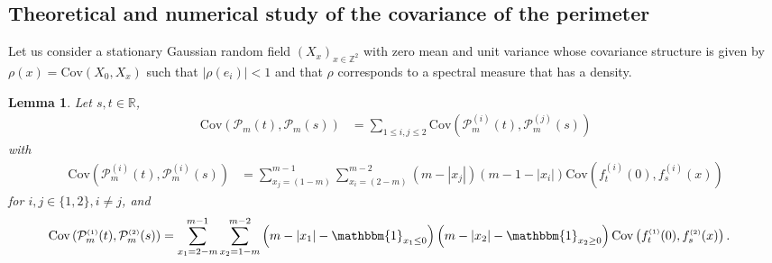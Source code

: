 \documentclass[12pt]{article}
\theoremstyle{Theorem}
\newtheorem{Lemma}[Theorem]{Lemma}
\theoremstyle{definition}
\begin{document}
\subsection{Theoretical and numerical study of the covariance of the perimeter}
Let us consider a stationary Gaussian random field $\left(X_{\scriptscriptstyle x}\right)_{x \in \mathbb{Z}^{2}}$ with zero mean and unit variance whose covariance structure is given by $\rho(x) = \text{Cov}\left(X_{\scriptscriptstyle 0}, X_{\scriptscriptstyle x}\right)$ such that $|\rho(e_i)| < 1$ and that $\rho$ corresponds to a spectral measure that has a density.
\begin{Lemma} 
Let $s, t \in \mathbb{R}$, 
\label{CovLemma}
\begin{align*}
\text{Cov}(\mathcal{P}_{m}(t), \mathcal{P}_{m}(s))  & = \sum_{1\leq i,j\leq 2}\text{Cov}(\mathcal{P}_{m}^{\scriptscriptstyle (i)}(t), \mathcal{P}_{m}^{\scriptscriptstyle (j)}(s)) 
\end{align*} 
with 
\begin{align*}
\text{Cov}\left(\mathcal{P}_{m}^{\scriptscriptstyle (i)}(t),\mathcal{P}_{m}^{\scriptscriptstyle (i)}(s) \right) 
& = \sum_{x_{\scriptscriptstyle j}=\left(1-m\right)}^{m-1}\sum_{x_{\scriptscriptstyle i}=\left(2-m\right)}^{m-2}\left(m -|x_{j}|\right)\left(m - 1- |x_{i}|\right) \text{Cov}\left(f_{t}^{\scriptscriptstyle (i)}(0), f_{s}^{\scriptscriptstyle (i)}(x) \right) 
\end{align*} 
for $i,j \in\{1,2\}, i\neq j$, and 
\begin{align*}
\text{Cov}\left(\mathcal{P}_{m}^{\scriptscriptstyle (1)}(t),\mathcal{P}_{m}^{\scriptscriptstyle (2)}(s) \right) 
& = \sum_{x_1=2-m}^{m-1} \sum_{x_2 = 1-m}^{m-2} \left(m-|x_1| - \mathbbm{1}_{x_{1} \leq 0}\right)\left(m-|x_2|-\mathbbm{1}_{x_{2} \geq 0}\right)\text{Cov}\left(f_{t}^{\scriptscriptstyle (1)}(0), f_{s}^{ \scriptscriptstyle (2)}(x) \right).
\end{align*}
\end{Lemma}
\end{document}
